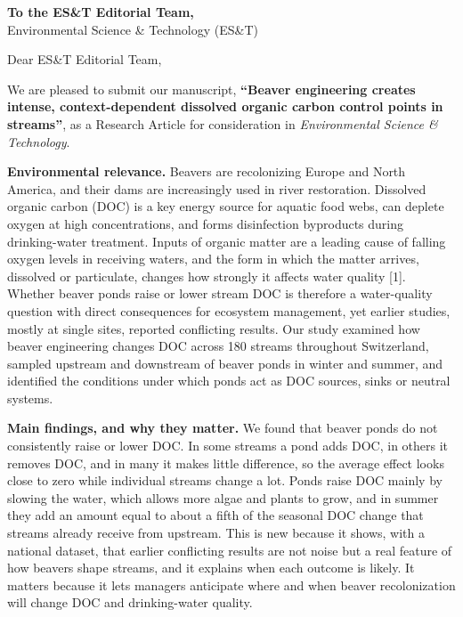 \documentclass[11pt,a4paper]{article}
\begin{document}
\textbf{To the ES\&T Editorial Team,}\\
Environmental Science \& Technology (ES\&T)

\bigskip

Dear ES\&T Editorial Team,

We are pleased to submit our manuscript, \textbf{``Beaver engineering creates intense, context-dependent dissolved organic carbon control points in streams''}, as a Research Article for consideration in \emph{Environmental Science \& Technology}.

\textbf{Environmental relevance.} Beavers are recolonizing Europe and North America, and their dams are increasingly used in river restoration. Dissolved organic carbon (DOC) is a key energy source for aquatic food webs, can deplete oxygen at high concentrations, and forms disinfection byproducts during drinking-water treatment. Inputs of organic matter are a leading cause of falling oxygen levels in receiving waters, and the form in which the matter arrives, dissolved or particulate, changes how strongly it affects water quality [1]. Whether beaver ponds raise or lower stream DOC is therefore a water-quality question with direct consequences for ecosystem management, yet earlier studies, mostly at single sites, reported conflicting results. Our study examined how beaver engineering changes DOC across 180 streams throughout Switzerland, sampled upstream and downstream of beaver ponds in winter and summer, and identified the conditions under which ponds act as DOC sources, sinks or neutral systems.

\textbf{Main findings, and why they matter.} We found that beaver ponds do not consistently raise or lower DOC. In some streams a pond adds DOC, in others it removes DOC, and in many it makes little difference, so the average effect looks close to zero while individual streams change a lot. Ponds raise DOC mainly by slowing the water, which allows more algae and plants to grow, and in summer they add an amount equal to about a fifth of the seasonal DOC change that streams already receive from upstream. This is new because it shows, with a national dataset, that earlier conflicting results are not noise but a real feature of how beavers shape streams, and it explains when each outcome is likely. It matters because it lets managers anticipate where and when beaver recolonization will change DOC and drinking-water quality.
\end{document}
